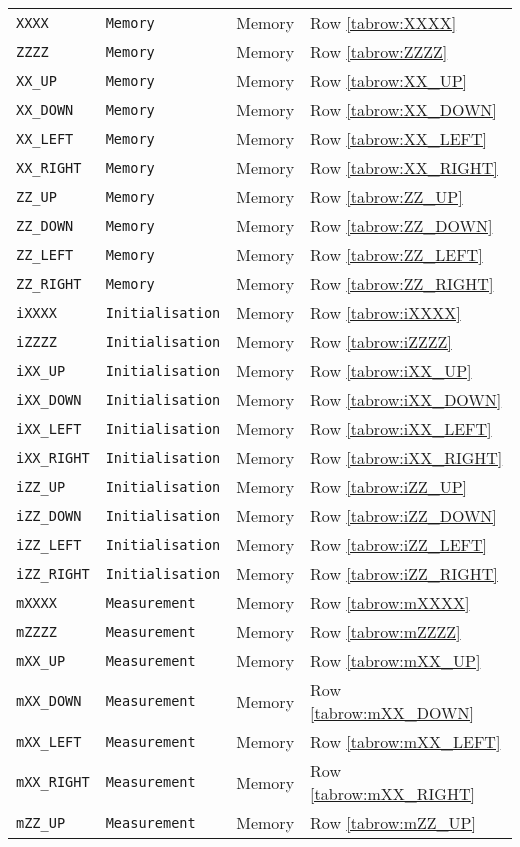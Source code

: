 \documentclass{article}
\newcommand{\internalTableLine}[3]{\texttt{#1} & \texttt{#2} & #3 & Row \ref{tabrow:#1}}
\begin{document}
\begin{longtable}{ |l|l|l|l| }
    \internalTableLine{XXXX}{Memory}{Memory} \\
    \internalTableLine{ZZZZ}{Memory}{Memory} \\
    \internalTableLine{XX_UP}{Memory}{Memory} \\
    \internalTableLine{XX_DOWN}{Memory}{Memory} \\
    \internalTableLine{XX_LEFT}{Memory}{Memory} \\
    \internalTableLine{XX_RIGHT}{Memory}{Memory} \\
    \internalTableLine{ZZ_UP}{Memory}{Memory} \\
    \internalTableLine{ZZ_DOWN}{Memory}{Memory} \\
    \internalTableLine{ZZ_LEFT}{Memory}{Memory} \\
    \internalTableLine{ZZ_RIGHT}{Memory}{Memory} \\
    \hline
    \internalTableLine{iXXXX}{Initialisation}{Memory} \\
    \internalTableLine{iZZZZ}{Initialisation}{Memory} \\
    \internalTableLine{iXX_UP}{Initialisation}{Memory} \\
    \internalTableLine{iXX_DOWN}{Initialisation}{Memory} \\
    \internalTableLine{iXX_LEFT}{Initialisation}{Memory} \\
    \internalTableLine{iXX_RIGHT}{Initialisation}{Memory} \\
    \internalTableLine{iZZ_UP}{Initialisation}{Memory} \\
    \internalTableLine{iZZ_DOWN}{Initialisation}{Memory} \\
    \internalTableLine{iZZ_LEFT}{Initialisation}{Memory} \\
    \internalTableLine{iZZ_RIGHT}{Initialisation}{Memory} \\
    \hline
    \internalTableLine{mXXXX}{Measurement}{Memory} \\
    \internalTableLine{mZZZZ}{Measurement}{Memory} \\
    \internalTableLine{mXX_UP}{Measurement}{Memory} \\
    \internalTableLine{mXX_DOWN}{Measurement}{Memory} \\
    \internalTableLine{mXX_LEFT}{Measurement}{Memory} \\
    \internalTableLine{mXX_RIGHT}{Measurement}{Memory} \\
    \internalTableLine{mZZ_UP}{Measurement}{Memory} \\

\end{longtable}
\end{document}
